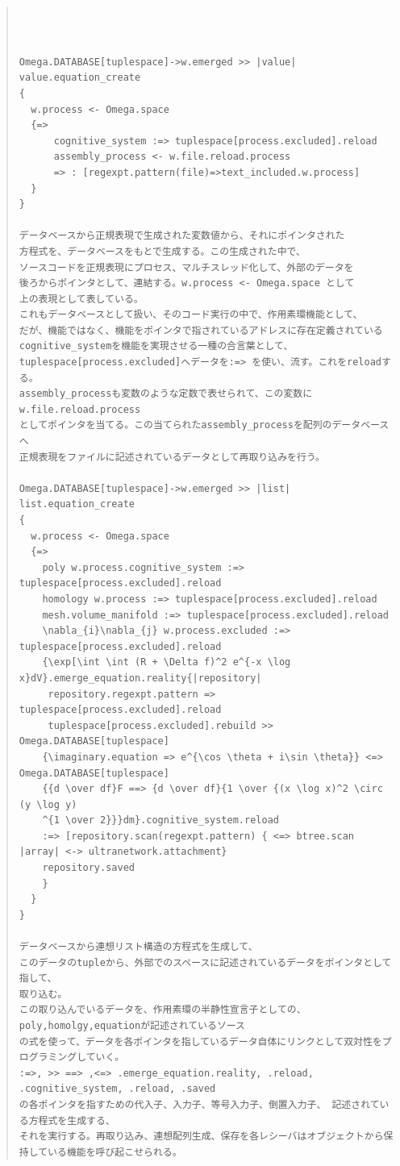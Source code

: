 \documentclass{jsarticle}
\begin{document}
\begin{quote}
\setlength{\baselineskip}{12pt}
\begin{verbatim}



Omega.DATABASE[tuplespace]->w.emerged >> |value| value.equation_create
{
  w.process <- Omega.space
  {=>
      cognitive_system :=> tuplespace[process.excluded].reload
      assembly_process <- w.file.reload.process
      => : [regexpt.pattern(file)=>text_included.w.process]
  }
}

データベースから正規表現で生成された変数値から、それにポインタされた
方程式を、データベースをもとで生成する。この生成された中で、
ソースコードを正規表現にプロセス、マルチスレッド化して、外部のデータを
後ろからポインタとして、連結する。w.process <- Omega.space として
上の表現として表している。
これもデータベースとして扱い、そのコード実行の中で、作用素環機能として、
だが、機能ではなく、機能をポインタで指されているアドレスに存在定義されている
cognitive_systemを機能を実現させる一種の合言葉として、
tuplespace[process.excluded]へデータを:=> を使い、流す。これをreloadする。
assembly_processも変数のような定数で表せられて、この変数にw.file.reload.process
としてポインタを当てる。この当てられたassembly_processを配列のデータベースへ
正規表現をファイルに記述されているデータとして再取り込みを行う。

Omega.DATABASE[tuplespace]->w.emerged >> |list| list.equation_create
{
  w.process <- Omega.space
  {=>
    poly w.process.cognitive_system :=> tuplespace[process.excluded].reload
    homology w.process :=> tuplespace[process.excluded].reload
    mesh.volume_manifold :=> tuplespace[process.excluded].reload
    \nabla_{i}\nabla_{j} w.process.excluded :=> tuplespace[process.excluded].reload
    {\exp[\int \int (R + \Delta f)^2 e^{-x \log x}dV}.emerge_equation.reality{|repository|
     repository.regexpt.pattern => tuplespace[process.excluded].reload
     tuplespace[process.excluded].rebuild >> Omega.DATABASE[tuplespace]
    {\imaginary.equation => e^{\cos \theta + i\sin \theta}} <=> Omega.DATABASE[tuplespace]
    {{d \over df}F ==> {d \over df}{1 \over {(x \log x)^2 \circ (y \log y)
    ^{1 \over 2}}}dm}.cognitive_system.reload 
    :=> [repository.scan(regexpt.pattern) { <=> btree.scan |array| <-> ultranetwork.attachment}
    repository.saved
    }
  }
}

データベースから連想リスト構造の方程式を生成して、
このデータのtupleから、外部でのスペースに記述されているデータをポインタとして指して、
取り込む。
この取り込んでいるデータを、作用素環の半静性宣言子としての、poly,homolgy,equationが記述されているソース
の式を使って、データを各ポインタを指しているデータ自体にリンクとして双対性をプログラミングしていく。
:=>, >> ==> ,<=> .emerge_equation.reality, .reload, .cognitive_system, .reload, .saved
の各ポインタを指すための代入子、入力子、等号入力子、倒置入力子、 記述されている方程式を生成する、
それを実行する。再取り込み、連想配列生成、保存を各レシーバはオブジェクトから保持している機能を呼び起こせられる。
 \end{verbatim}
\end{quote}
    
\end{document}
